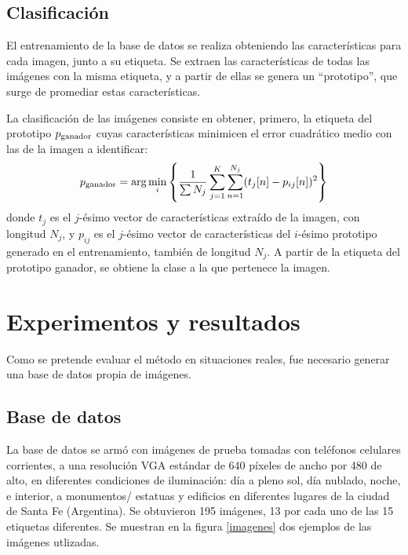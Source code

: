 \documentclass[conference,a4paper,10pt,oneside,final]{tfmpd}
\begin{document}
\subsection*{Clasificación}
El entrenamiento de la base de datos se realiza obteniendo las características
para cada imagen, junto a su etiqueta.
Se extraen las características de todas las imágenes
con la misma etiqueta, y a partir de ellas se genera un
``prototipo'', que surge de promediar estas características.

La clasificación de las imágenes consiste en
obtener, primero, la e\-ti\-que\-ta del prototipo $p_{\textrm{ganador}}$
cuyas características
minimicen el error cuadrático medio con las de la imagen a identificar:
\begin{equation}
  p_{\textrm{ganador}}=\arg \min_i\left\{ \frac{1}{\sum N_j}
                \sum_{j=1}^K\sum_{n=1}^{N_j}(t_j[n]-p_{ij}[n])^2\right\}
\end{equation}
donde $t_j$ es el $j$-ésimo vector de características extraído de la imagen, con
longitud $N_j$, y $p_{ij}$ es el $j$-ésimo vector de características del
$i$-ésimo prototipo generado en el entrenamiento, también de longitud $N_j$.
A partir de la etiqueta del prototipo ganador, se obtiene la clase a
la que pertenece la imagen.%
%
%
%
%
\section{Experimentos y resultados}
Como se pretende evaluar el método en situaciones reales, fue necesario generar
una base de datos propia de imágenes.
%
%
\subsection*{Base de datos}
La base de datos se armó con imágenes de prueba tomadas con teléfonos celulares
corrientes, a una resolución VGA estándar de 640 píxeles de ancho por 480 de
alto, en diferentes condiciones
de iluminación: día a pleno sol, día nublado, noche, e interior, a monumentos/%
estatuas y edificios en diferentes lugares de la ciudad de Santa Fe (Argentina).
{Se obtuvieron 195 imágenes, 13 por cada uno de las 15 etiquetas diferentes.}
Se muestran en la figura \ref{imagenes} dos ejemplos de las imágenes utlizadas.
%
%
\end{document}
